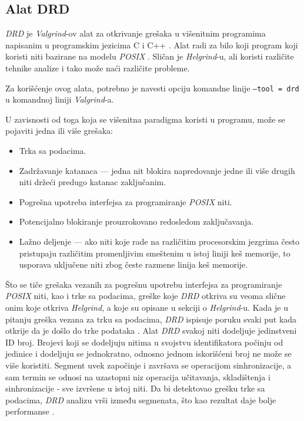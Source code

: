 \documentclass[12pt,oneside]{memoir}
\theoremstyle{plain}
\theoremstyle{definition}
\begin{document}
\subsection{Alat DRD}
\textit{DRD} je \textit{Valgrind}-ov alat za otkrivanje grešaka u višenitnim programima napisanim u programskim jezicima C i C++ \cite{Drd}. Alat radi za bilo koji program koji koristi niti bazirane na modelu \textit{POSIX} \cite{Drd}. Sličan je \textit{Helgrind}-u, ali koristi različite tehnike analize i tako može naći različite probleme.

Za korišćenje ovog alata, potrebno je navesti opciju komandne linije \texttt{--tool = drd} u komandnoj liniji \textit{Valgrind}-a.

U zavisnosti od toga koja se višenitna paradigma koristi u programu, može se pojaviti jedna ili više grešaka:
\begin{itemize}
\item Trka sa podacima.
\item Zadržavanje katanaca --- jedna nit blokira napredovanje jedne ili više drugih niti držeći predugo katanac zaključanim.
\item Pogrešna upotreba interfejsa za programiranje \textit{POSIX} niti.
\item Potencijalno blokiranje prouzrokovano redosledom zaključavanja.
\item Lažno deljenje --- ako niti koje rade na različitim procesorskim jezgrima često pristupaju različitim promenljivim smeštenim u istoj liniji keš memorije, to usporava uključene niti zbog česte razmene linija keš memorije.
\end{itemize} 

Što se tiče grešaka vezanih za pogrešnu upotrebu interfejsa za programiranje \textit{POSIX} niti, kao i trke sa podacima, greške koje \textit{DRD} otkriva su veoma slične onim koje otkriva \textit{Helgrind}, a koje su opisane u sekciji o \textit{Helgrind}-u. Kada je u pitanju greška vezana za trku sa podacima, \textit{DRD} ispisuje poruku svaki put kada otkrije da je došlo do trke podataka \cite{Drd}. Alat \textit{DRD} svakoj niti dodeljuje jedinstveni ID broj. Brojevi koji se dodeljuju nitima u svojstvu identifikatora počinju od jedinice i dodeljuju se jednokratno, odnosno jednom iskorišćeni broj ne može se više koristiti. Segment uvek započinje i završava se operacijom sinhronizacije, a sam termin se odnosi na uzastopni niz operacija učitavanja, skladištenja i sinhronizacije - sve izvršene u istoj niti. Da bi detektovao grešku trke sa podacima, \textit{DRD} analizu vrši između segmenata, što kao rezultat daje bolje performanse \cite{Drd}.
\end{document}
